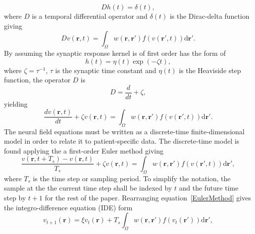 \documentclass[]{article}
\begin{document}
\begin{equation}
	\label{GreensFuncDef} Dh\left( t \right) = \delta \left( t \right), 
\end{equation}
where $D$ is a temporal differential operator and $\delta(t)$ is the Dirac-delta function giving 
\begin{equation}
	\label{FinalFormContinuous} 
	Dv\left( \mathbf{r},t \right) = \int_\Omega {w\left( \mathbf{r},\mathbf{r}' \right)f\left( {v\left( \mathbf{r}',t \right)} \right)\textrm{d}\mathbf{r}'}. 
\end{equation}
By assuming the synaptic response kernel is of first order has the form of
\begin{equation}
	\label{SynapticRespKernel} h(t) = \eta(t)\exp{\left(-\zeta t\right)}, 
\end{equation}
where $\zeta=\tau^{-1}$, $\tau$ is the synaptic time constant and $\eta(t)$ is the Heaviside step function, the operator $D$ is
\begin{equation}
	D=\frac{d}{dt} + \zeta,
\end{equation}
yielding
\begin{equation}
	\label{FinalFormContinuous} 
	\frac{dv\left( \mathbf{r},t \right)}{dt} + \zeta v\left( \mathbf{r},t \right) = \int_\Omega {w\left( \mathbf{r},\mathbf{r}' \right)f\left( {v\left( \mathbf{r}',t \right)} \right)\textrm{d}\mathbf{r}'}. 
\end{equation}
The neural field equations must be written as a discrete-time finite-dimensional model in order to relate it to patient-specific data. The discrete-time model is found applying the a first-order Euler method giving
\begin{equation}\label{EulerMethod}
	\frac{v\left( \mathbf{r},t+T_s \right)-v\left( \mathbf{r},t \right)}{T_s} + \zeta v\left(\mathbf{r},t \right) = \int_\Omega {w\left( \mathbf{r},\mathbf{r}' \right) f\left( {v\left( \mathbf{r}',t \right)}\right)\textrm{d}\mathbf{r}'},
\end{equation}
where $T_s$ is the time step or sampling period. To simplify the notation, the sample at the the current time step shall be indexed by $t$ and the future time step by $t+1$ for the rest of the paper. Rearranging equation~\ref{EulerMethod} gives the integro-difference equation (IDE) form
\begin{equation}
	\label{DiscreteTimeModel} 
	v_{t+1}\left(\mathbf{r}\right) = 
	\xi v_t\left(\mathbf{r}\right) + 
	T_s \int_\Omega { 
	    w\left(\mathbf{r},\mathbf{r}'\right)
	    f\left(v_t\left(\mathbf{r}'\right)\right) 
	\textrm{d}\mathbf{r}'}, 
\end{equation}
\end{document}
